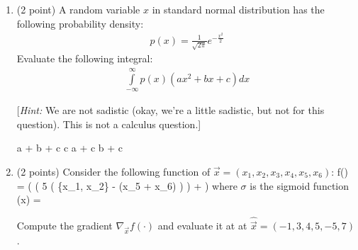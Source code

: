 \begin{enumerate}[start]
\item (2 point) A random variable $x$ in standard normal distribution 
has the following probability density:
%
\begin{align}
p(x) = \frac{1}{{\sqrt {2\pi } }}{e^{ - \frac{{{x^2}}}{2}}}
\end{align}
%
Evaluate the following integral:
%
\begin{align}
\int\limits_{ - \infty }^\infty  {p(x)(a{x^2} + b{x} + c)dx}
\end{align}

[\emph{Hint:} We are not sadistic (okay, we're a little sadistic, but not for this question). This is not a calculus question.]\\

\begin{oneparcheckboxes}
	\choice a + b + c
	\choice c
	\choice a + c
	\choice b + c
\end{oneparcheckboxes}

\vspace{2cm}

	\item
	(2 points)
	Consider the following function of $\vec{x} = (x_1, x_2, x_3, x_4, x_5, x_6)$:
	\beqn
	f() = \sigma\left( \log\left( 5 \left(
	\max\{x_1, x_2\} \cdot {} - (x_5 + x_6) \right)
	\right) +  \right)
	\eeqn
	where $\sigma$ is the sigmoid function
	\beqn
	\sigma(x) = 
	\eeqn
	
	Compute the gradient $\nabla_{\vec{x}} f(\cdot)$ and evaluate it at at $\hat{\vec{x}} = (-1, 3, 4, 5, -5, 7)$.
	

\end{enumerate}
